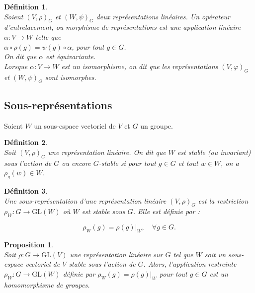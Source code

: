 \documentclass[a4paper, 14pt]{report}
\newtheorem{definition}{Définition}[section]
\newtheorem{proposition}{Proposition}[section]
\begin{document}
\begin{onehalfspace}
{\begin{definition} \cite{serre1971representation} \\
Soient \( (V, \rho)_{G} \) et \( (W, \psi)_{G} \) deux représentations linéaires. Un opérateur d'entrelacement, ou morphisme de représentations est une application linéaire \( \alpha : V \to W \) telle que \\
\(\alpha \circ \rho(g) = \psi (g) \circ \alpha \), pour tout \( g \in G \).\\
On dit que \( \alpha \) est équivariante.\\
Lorsque \( \alpha : V \to W \) est un isomorphisme, on dit que les représentations \( (V, \varphi)_{G} \) et \( (W, \psi)_{G} \) sont isomorphes.
\end{definition}



\subsection{Sous-représentations}
Soient \( W \) un sous-espace vectoriel de \( V \) et \( G \) un groupe.
\begin{definition} \cite{serre1971representation} \\
Soit \( (V, \rho)_{G} \) une représentation linéaire. On dit que \( W \) est stable (ou invariant) sous l'action de \( G \) ou encore $G$-stable si pour tout \( g \in G \) et tout \( w \in W \), on a \( \rho_g(w) \in W \).
\end{definition}

\begin{definition} \cite{serre1971representation}\\
Une sous-représentation d'une représentation linéaire \((V,\rho)_{G} \) est la restriction  \\
\( \rho_W : G \rightarrow \mathrm{GL}(W) \) où \( W \) est stable sous \( G \). Elle est définie par :
	
	\[
	\rho_W(g) = \rho(g)|_W, \quad \forall g \in G.
	\]
	
\end{definition}


\begin{proposition} \cite{serre1971representation} \label{propo0} \\
Soit \( \rho : G \rightarrow \mathrm{GL}(V) \) une représentation linéaire sur \( G \) tel que \( W \) soit un sous-espace vectoriel de \( V \) stable sous l'action de \( G \). Alors, l'application restreinte \( \rho_W : G \rightarrow \mathrm{GL}(W) \) définie par \( \rho_W(g) = \rho(g)|_W \) pour tout \( g \in G \) est un homomorphisme de groupes.	
\end{proposition}


}
\end{onehalfspace}
\end{document}
